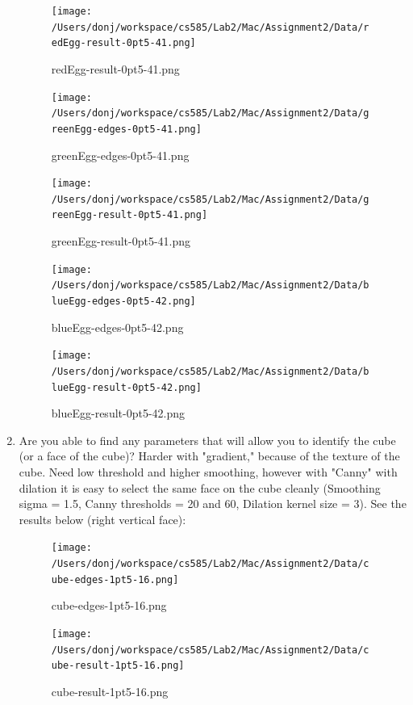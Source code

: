 \documentclass{article}
\begin{document}
\begin{enumerate}
\begin{figure}[H]
\centering
\texttt{[image: /Users/donj/workspace/cs585/Lab2/Mac/Assignment2/Data/redEgg-result-0pt5-41.png]}
\caption{redEgg-result-0pt5-41.png}
\label{overflow}
\end{figure}

\begin{figure}[H]
\centering
\texttt{[image: /Users/donj/workspace/cs585/Lab2/Mac/Assignment2/Data/greenEgg-edges-0pt5-41.png]}
\caption{greenEgg-edges-0pt5-41.png}
\label{overflow}
\end{figure}

\begin{figure}[H]
\centering
\texttt{[image: /Users/donj/workspace/cs585/Lab2/Mac/Assignment2/Data/greenEgg-result-0pt5-41.png]}
\caption{greenEgg-result-0pt5-41.png}
\label{overflow}
\end{figure}

\begin{figure}[H]
\centering
\texttt{[image: /Users/donj/workspace/cs585/Lab2/Mac/Assignment2/Data/blueEgg-edges-0pt5-42.png]}
\caption{blueEgg-edges-0pt5-42.png}
\label{overflow}
\end{figure}

\begin{figure}[H]
\centering
\texttt{[image: /Users/donj/workspace/cs585/Lab2/Mac/Assignment2/Data/blueEgg-result-0pt5-42.png]}
\caption{blueEgg-result-0pt5-42.png}
\label{overflow}
\end{figure}

\item
Are you able to find any parameters that will allow you to identify the cube (or a face of the cube)? Harder with "gradient," because of the texture of the cube. Need low threshold and higher smoothing, however with "Canny" with dilation it is easy to select the same face on the cube cleanly (Smoothing sigma = 1.5, Canny thresholds = 20 and 60, Dilation kernel size = 3). See the results below (right vertical face):

\begin{figure}[H]
\centering
\texttt{[image: /Users/donj/workspace/cs585/Lab2/Mac/Assignment2/Data/cube-edges-1pt5-16.png]}
\caption{cube-edges-1pt5-16.png}
\label{overflow}
\end{figure}

\begin{figure}[H]
\centering
\texttt{[image: /Users/donj/workspace/cs585/Lab2/Mac/Assignment2/Data/cube-result-1pt5-16.png]}
\caption{cube-result-1pt5-16.png}
\label{overflow}
\end{figure}


\end{enumerate}
\end{document}
